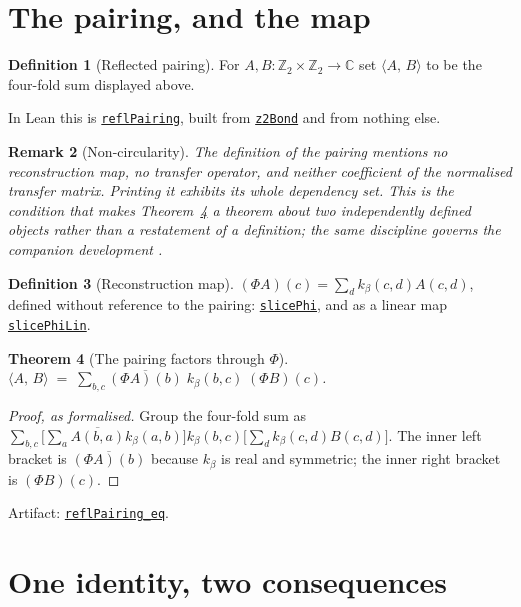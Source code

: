 \documentclass[11pt]{article}
\newtheorem{theorem}{Theorem}[section]
\newtheorem{remark}[theorem]{Remark}
\theoremstyle{definition}
\newtheorem{definition}[theorem]{Definition}
\newcommand{\anchor}{673d1df122ac7110e6f7b52795b44a02d38d8d24}
\newcommand{\osline}[3]{%
  \href{https://github.com/lluiseriksson/THE-ERIKSSON-PROGRAMME/blob/\anchor/YangMills/OS/#1.lean\#L#2}{\nolinkurl{#3}}}
\newcommand{\C}{\mathbb{C}}
\newcommand{\Z}{\mathbb{Z}}
\newcommand{\inn}[2]{\langle #1,\, #2\rangle}
\begin{document}
\section{The pairing, and the map}

\begin{definition}[Reflected pairing]
For $A,B : \Z_2\times\Z_2 \to \C$ set
$\inn{A}{B}$ to be the four-fold sum displayed above.
\end{definition}

In Lean this is \osline{Z2Quotient}{87}{reflPairing}, built from
\osline{Z2Identification}{76}{z2Bond} and from nothing else.

\begin{remark}[Non-circularity]\label{rem:noncirc}
The definition of the pairing mentions no reconstruction map, no transfer
operator, and neither coefficient of the normalised transfer matrix.  Printing
it exhibits its whole dependency set.  This is the condition that makes
Theorem~\ref{thm:factor} a theorem about two independently defined objects
rather than a restatement of a definition; the same discipline governs the
companion development \cite{ErikssonOSChain}.
\end{remark}

\begin{definition}[Reconstruction map]
$(\Phi A)(c) = \sum_d k_\beta(c,d) A(c,d)$, defined without reference to the
pairing: \osline{Z2Quotient}{96}{slicePhi}, and as a linear map
\osline{Z2Quotient}{106}{slicePhiLin}.
\end{definition}

\begin{theorem}[The pairing factors through $\Phi$]\label{thm:factor}
$\displaystyle \inn{A}{B} \;=\; \sum_{b,c}
   \overline{(\Phi A)(b)}\; k_\beta(b,c)\; (\Phi B)(c)$.
\end{theorem}

\begin{proof}[Proof, as formalised]
Group the four-fold sum as $\sum_{b,c}\bigl[\sum_a \overline{A(b,a)}k_\beta(a,b)\bigr]
k_\beta(b,c)\bigl[\sum_d k_\beta(c,d)B(c,d)\bigr]$.  The inner left bracket is
$\overline{(\Phi A)(b)}$ because $k_\beta$ is real and symmetric; the inner right
bracket is $(\Phi B)(c)$.
\end{proof}

Artifact: \osline{Z2Quotient}{128}{reflPairing\_eq}.

\section{One identity, two consequences}
\end{document}
